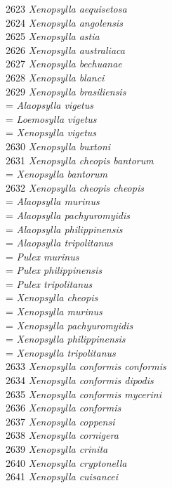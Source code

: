 \documentclass[
]{article}
\begin{document}
2623 \emph{Xenopsylla aequisetosa}\\
2624 \emph{Xenopsylla angolensis}\\
2625 \emph{Xenopsylla astia}\\
2626 \emph{Xenopsylla australiaca}\\
2627 \emph{Xenopsylla bechuanae}\\
2628 \emph{Xenopsylla blanci}\\
2629 \emph{Xenopsylla brasiliensis}\\
= \emph{Alaopsylla vigetus}\\
= \emph{Loemosylla vigetus}\\
= \emph{Xenopsylla vigetus}\\
2630 \emph{Xenopsylla buxtoni}\\
2631 \emph{Xenopsylla cheopis bantorum}\\
= \emph{Xenopsylla bantorum}\\
2632 \emph{Xenopsylla cheopis cheopis}\\
= \emph{Alaopsylla murinus}\\
= \emph{Alaopsylla pachyuromyidis}\\
= \emph{Alaopsylla philippinensis}\\
= \emph{Alaopsylla tripolitanus}\\
= \emph{Pulex murinus}\\
= \emph{Pulex philippinensis}\\
= \emph{Pulex tripolitanus}\\
= \emph{Xenopsylla cheopis}\\
= \emph{Xenopsylla murinus}\\
= \emph{Xenopsylla pachyuromyidis}\\
= \emph{Xenopsylla philippinensis}\\
= \emph{Xenopsylla tripolitanus}\\
2633 \emph{Xenopsylla conformis conformis}\\
2634 \emph{Xenopsylla conformis dipodis}\\
2635 \emph{Xenopsylla conformis mycerini}\\
2636 \emph{Xenopsylla conformis}\\
2637 \emph{Xenopsylla coppensi}\\
2638 \emph{Xenopsylla cornigera}\\
2639 \emph{Xenopsylla crinita}\\
2640 \emph{Xenopsylla cryptonella}\\
2641 \emph{Xenopsylla cuisancei}\\
\end{document}
